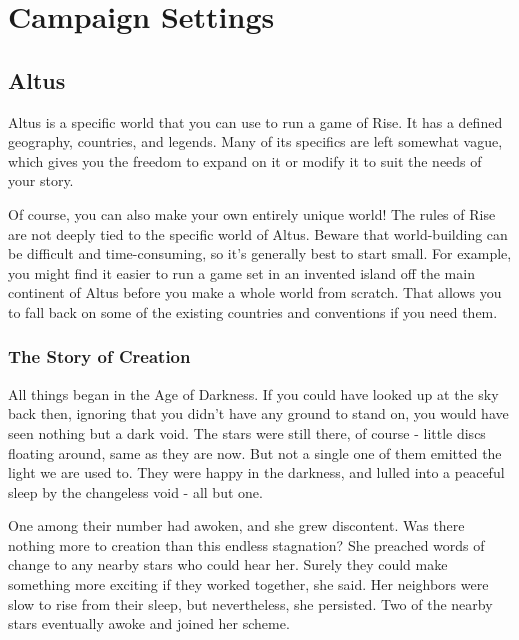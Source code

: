 \chapter{Campaign Settings}\label{Campaign Settings}

\section{Altus}


  Altus is a specific world that you can use to run a game of Rise.
  It has a defined geography, countries, and legends.
  Many of its specifics are left somewhat vague, which gives you the freedom to expand on it or modify it to suit the needs of your story.

  Of course, you can also make your own entirely unique world!
  The rules of Rise are not deeply tied to the specific world of Altus.
  Beware that world-building can be difficult and time-consuming, so it's generally best to start small.
  For example, you might find it easier to run a game set in an invented island off the main continent of Altus before you make a whole world from scratch.
  That allows you to fall back on some of the existing countries and conventions if you need them.

  \subsection{The Story of Creation}

    All things began in the Age of Darkness.
    If you could have looked up at the sky back then, ignoring that you didn't have any ground to stand on, you would have seen nothing but a dark void.
    The stars were still there, of course - little discs floating around, same as they are now.
    But not a single one of them emitted the light we are used to.
    They were happy in the darkness, and lulled into a peaceful sleep by the changeless void - all but one.

    One among their number had awoken, and she grew discontent.
    Was there nothing more to creation than this endless stagnation?
    She preached words of change to any nearby stars who could hear her.
    Surely they could make something more exciting if they worked together, she said.
    Her neighbors were slow to rise from their sleep, but nevertheless, she persisted.
    Two of the nearby stars eventually awoke and joined her scheme.

